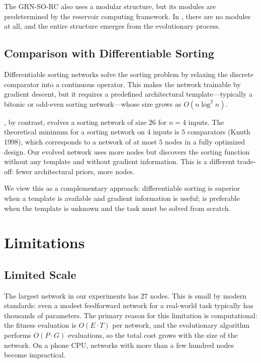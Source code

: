 The GRN-SO-RC also uses a modular structure, but its modules are
predetermined by the reservoir computing framework. In \modnet{}, there
are no modules at all, and the entire structure emerges from the
evolutionary process.

\subsection{Comparison with Differentiable Sorting}
\label{sec:disc-diff-sort}

Differentiable sorting networks \citep{petersen2022deep, grover2019differentiable}
solve the sorting problem by relaxing the discrete comparator into a
continuous operator. This makes the network trainable by gradient
descent, but it requires a predefined architectural template---typically
a bitonic or odd-even sorting network---whose size grows as
$O(n \log^2 n)$.

\modnet{}, by contrast, evolves a sorting network of size $26$ for
$n = 4$ inputs. The theoretical minimum for a sorting network on $4$
inputs is $5$ comparators (Knuth 1998), which corresponds to a
network of at most $5$ nodes in a fully optimized design. Our evolved
network uses more nodes but discovers the sorting function without any
template and without gradient information. This is a different
trade-off: fewer architectural priors, more nodes.

We view this as a complementary approach: differentiable sorting is
superior when a template is available and gradient information is
useful; \modnet{} is preferable when the template is unknown and the
task must be solved from scratch.

\section{Limitations}
\label{sec:disc-limitations}

\subsection{Limited Scale}
\label{sec:disc-scale}

The largest network in our experiments has $27$ nodes. This is small by
modern standards: even a modest feedforward network for a real-world
task typically has thousands of parameters. The primary reason for this
limitation is computational: the fitness evaluation is $O(E \cdot T)$
per network, and the evolutionary algorithm performs $O(P \cdot G)$
evaluations, so the total cost grows with the size of the network. On a
phone CPU, networks with more than a few hundred nodes become
impractical.

